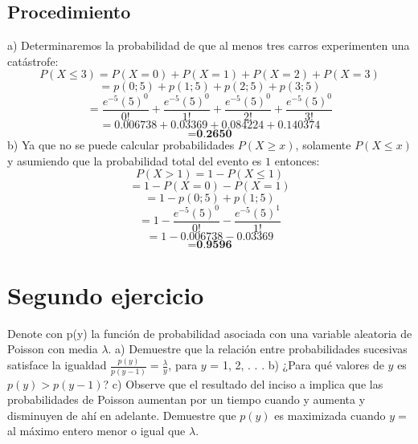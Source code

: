 \documentclass[12pt,letterpaper]{article}
\begin{document}
\subsection{Procedimiento}
a) Determinaremos la probabilidad de que al menos tres carros experimenten una catástrofe: 
\begin{equation}
    P(X \leq 3)=P(X=0)+P(X=1)+P(X=2)+P(X=3)
\end{equation}
\begin{equation}
    =p(0;5)+p(1;5)+p(2;5)+p(3;5)
\end{equation}
\begin{equation}
    =\frac{e^{-5}(5)^{0}}{0!}+\frac{e^{-5}(5)^{0}}{1!}+\frac{e^{-5}(5)^{0}}{2!}+\frac{e^{-5}(5)^{0}}{3!}
\end{equation}
\begin{equation}
=0.006738+0.03369+0.084224+0.140374
\end{equation}
\begin{equation}
\textbf{=0.2650}
\end{equation}\newline
b) Ya que no se puede calcular probabilidades $P(X\geq x)$, solamente $P(X\leq x)$ y asumiendo que la probabilidad total del evento es $1$ entonces:
\begin{equation}
    P(X>1)=1-P(X \leq 1)
\end{equation}
\begin{equation}
    =1-P(X=0)-P(X=1)
\end{equation}
\begin{equation}
    =1-p(0;5)+p(1;5)
\end{equation}
\begin{equation}
    =1-\frac{e^{-5}(5)^{0}}{0!}-\frac{e^{-5}(5)^{1}}{1!}  
\end{equation}
\begin{equation}
    =1-0.006738-0.03369
\end{equation}
\begin{equation}
    \textbf{=0.9596}
\end{equation}

\section{Segundo ejercicio}
Denote con p(y) la función de probabilidad asociada con una variable aleatoria de Poisson con media $\lambda$.
a) Demuestre que la relación entre probabilidades sucesivas satisface la igualdad $\frac{p(y)}{p(y-1)}=\frac{\lambda}{y}$, \newline para $y$ =
1, 2, . . .\newline
b) ¿Para qué valores de $y$ es $p(y) > p(y - 1)$?\newline
c) Observe que el resultado del inciso a implica que las probabilidades de Poisson aumentan por un tiempo cuando y aumenta y disminuyen de ahí en adelante. Demuestre que $p(y)$ es maximizada cuando $y =$ al máximo entero menor o igual que $\lambda$.\cite{weckerly}
\end{document}
